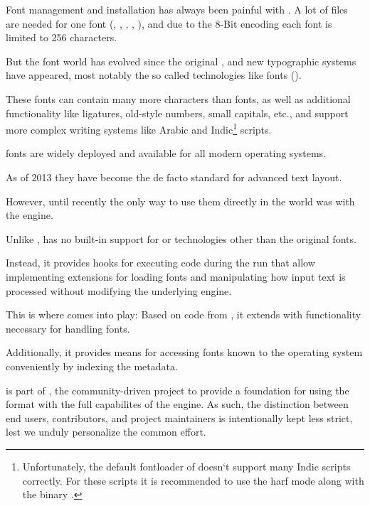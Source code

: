 Font management and installation has always been painful with \TEX.  A
lot of files are needed for one font (, ,
, , ), and due to the 8-Bit encoding
each font is limited to 256 characters.

But the font world has evolved since the original \TEX, and new
typographic systems have appeared, most notably the so called
 technologies like \OpenType fonts ().

These fonts can contain many more characters than \TEX fonts, as well
as additional functionality like ligatures, old-style numbers, small
capitals, etc., and support more complex writing systems like Arabic
and Indic\footnote{%
  Unfortunately, the default fontloader of  doesn‘t support many Indic
  scripts correctly. For these scripts it is recommended to use the harf mode along with the binary .}
scripts.

\OpenType fonts are widely deployed and available for all modern
operating systems.

As of 2013 they have become the de facto standard for advanced text
layout.

However, until recently the only way to use them directly in the \TEX
world was with the \XETEX engine.

Unlike \XETEX, \LUATEX has no built-in support for \OpenType or
technologies other than the original \TEX fonts.

Instead, it provides hooks for executing \LUA code during the \TEX run
that allow implementing extensions for loading fonts and manipulating
how input text is processed without modifying the underlying engine.

This is where  comes into play:
Based on code from \CONTEXT, it extends \LUATEX with functionality necessary
for handling \OpenType fonts.

Additionally, it provides means for accessing fonts known to the operating
system conveniently by indexing the metadata.

\endsection


 is part of \LUALATEX, the community-driven
project to provide a foundation for using the \LATEX format with the
full capabilites of the \LUATEX engine.
%
As such, the distinction between end users, contributors, and project
maintainers is intentionally kept less strict, lest we unduly
personalize the common effort.

